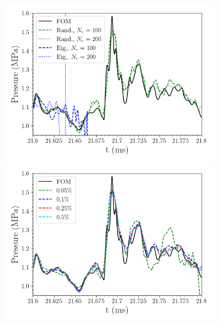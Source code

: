 \begin{figure}
	\begin{minipage}{0.49\linewidth}
		\includegraphics[width=0.99\linewidth]{Chapters/HPROMResults/Images/nineElem/deim/pressure_probe_deim_algs.png}
		\caption{\label{fig:nineElemDEIMProbeAlgo}}
	\end{minipage}
	\begin{minipage}{0.49\linewidth}
		\includegraphics[width=0.99\linewidth]{Chapters/HPROMResults/Images/nineElem/deim/pressure_probe_deim_random_samp.png}
		\caption{\label{fig:nineElemDEIMProbeAlgo}}
	\end{minipage}
\end{figure}

